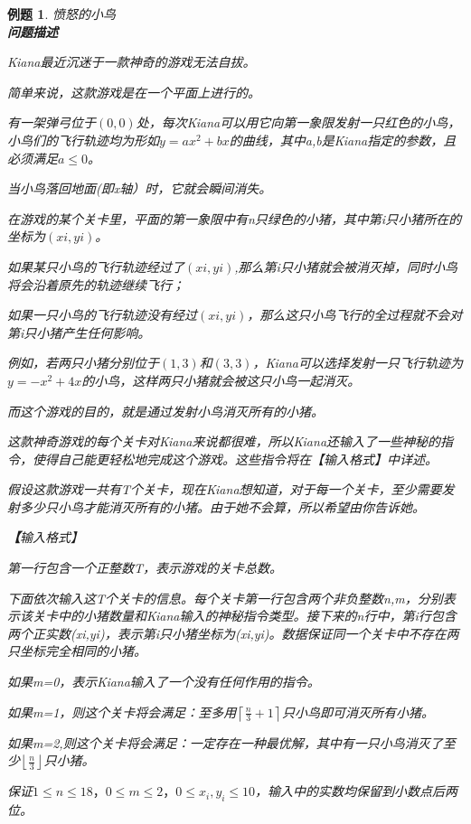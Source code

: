\documentclass{article}
\newtheorem{example}{例题}[subsection]
\theoremstyle{nonumberplain}
\begin{document}
\begin{example}愤怒的小鸟\\
\textbf{问题描述}

Kiana最近沉迷于一款神奇的游戏无法自拔。

简单来说，这款游戏是在一个平面上进行的。

有一架弹弓位于$(0,0)$处，每次Kiana可以用它向第一象限发射一只红色的小鸟，小鸟们的飞行轨迹均为形如$y=ax^2+bx$的曲线，其中a,b是Kiana指定的参数，且必须满足$a\leq 0$。

当小鸟落回地面(即x轴）时，它就会瞬间消失。

在游戏的某个关卡里，平面的第一象限中有n只绿色的小猪，其中第i只小猪所在的坐标为$(xi,yi)$。

如果某只小鸟的飞行轨迹经过了$(xi,yi)$,那么第i只小猪就会被消灭掉，同时小鸟将会沿着原先的轨迹继续飞行；

如果一只小鸟的飞行轨迹没有经过$(xi,yi)$，那么这只小鸟飞行的全过程就不会对第i只小猪产生任何影响。

例如，若两只小猪分别位于$(1,3)$和$(3,3)$，Kiana可以选择发射一只飞行轨迹为$y=-x^2+4x$的小鸟，这样两只小猪就会被这只小鸟一起消灭。

而这个游戏的目的，就是通过发射小鸟消灭所有的小猪。

这款神奇游戏的每个关卡对Kiana来说都很难，所以Kiana还输入了一些神秘的指令，使得自己能更轻松地完成这个游戏。这些指令将在【输入格式】中详述。

假设这款游戏一共有T个关卡，现在Kiana想知道，对于每一个关卡，至少需要发射多少只小鸟才能消灭所有的小猪。由于她不会算，所以希望由你告诉她。

\textbf【输入格式】

第一行包含一个正整数T，表示游戏的关卡总数。

下面依次输入这T个关卡的信息。每个关卡第一行包含两个非负整数n,m，分别表示该关卡中的小猪数量和Kiana输入的神秘指令类型。接下来的n行中，第i行包含两个正实数(xi,yi)，表示第i只小猪坐标为(xi,yi)。数据保证同一个关卡中不存在两只坐标完全相同的小猪。

如果m=0，表示Kiana输入了一个没有任何作用的指令。

如果m=1，则这个关卡将会满足：至多用$\left \lceil \frac{n}{3} + 1 \right \rceil$只小鸟即可消灭所有小猪。

如果m=2,则这个关卡将会满足：一定存在一种最优解，其中有一只小鸟消灭了至少$\left \lfloor \frac{n}{3} \right \rfloor$只小猪。

保证$1\leq n\leq 18，0\leq m\leq 2，0\leq x_i,y_i\leq 10$，输入中的实数均保留到小数点后两位。


\end{example}
\end{document}
